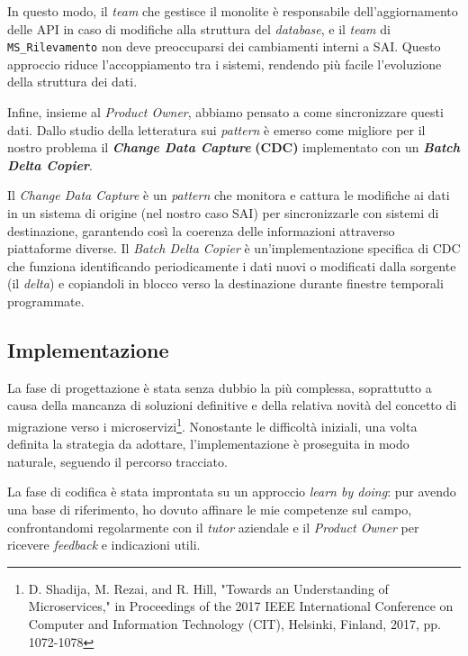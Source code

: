         \vspace{0.2 em}
        \noindent In questo modo, il \textit{team} che gestisce il monolite è responsabile dell’aggiornamento delle API in caso di modifiche alla struttura del \textit{database}, e il \textit{team} di \texttt{MS\_Rilevamento} non deve preoccuparsi dei cambiamenti interni a SAI. Questo approccio riduce l'accoppiamento tra i sistemi, rendendo più facile l'evoluzione della struttura dei dati.

        \vspace{0.2 em}
        \noindent Infine, insieme al \textit{Product Owner}, abbiamo pensato a come sincronizzare questi dati. Dallo studio della letteratura sui \textit{pattern} è emerso come migliore per il nostro problema il \textit{\textbf{Change Data Capture}} \textbf{(CDC)} implementato con un \textbf{\textit{Batch Delta Copier}}. 
        
        
        \vspace{0.2 em} 
        \noindent Il \textit{Change Data Capture} è un \textit{pattern} che monitora e cattura le modifiche ai dati in un sistema di origine (nel nostro caso SAI) per sincronizzarle con sistemi di destinazione, garantendo così la coerenza delle informazioni attraverso piattaforme diverse. Il \textit{Batch Delta Copier} è un'implementazione specifica di CDC che funziona identificando periodicamente i dati nuovi o modificati dalla sorgente (il \textit{delta}) e copiandoli in blocco verso la destinazione durante finestre temporali programmate.


        
        \subsection{Implementazione}
        La fase di progettazione è stata senza dubbio la più complessa, soprattutto a causa della mancanza di soluzioni definitive e della relativa novità del concetto di migrazione verso i microservizi\footnote{D. Shadija, M. Rezai, and R. Hill, "Towards an Understanding of Microservices," in Proceedings of the 2017 IEEE International Conference on Computer and Information Technology (CIT), Helsinki, Finland, 2017, pp. 1072-1078}. Nonostante le difficoltà iniziali, una volta definita la strategia da adottare, l’implementazione è proseguita in modo naturale, seguendo il percorso tracciato.  

        \vspace{0.2 em}
        \noindent La fase di codifica è stata improntata su un approccio \textit{learn by doing}: pur avendo una base di riferimento, ho dovuto affinare le mie competenze sul campo, confrontandomi regolarmente con il \textit{tutor} aziendale e il \textit{Product Owner} per ricevere \textit{feedback} e indicazioni utili.
        
